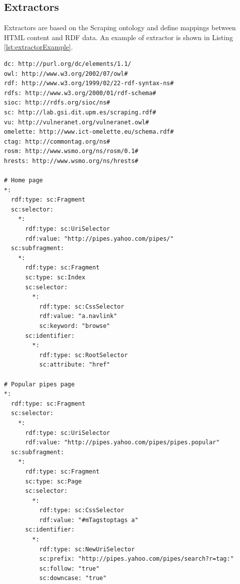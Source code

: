 \subsection{Extractors}

Extractors are based on the Scraping ontology and define mappings between HTML content
and RDF data. An example of extractor is shown in Listing \ref{lst:extractorExample}.


\begin{lstlisting}[style=mono,breaklines=true,label={lst:extractorExample}, caption=Extractor example for Yahoo! Pipes]
dc: http://purl.org/dc/elements/1.1/
owl: http://www.w3.org/2002/07/owl#
rdf: http://www.w3.org/1999/02/22-rdf-syntax-ns#
rdfs: http://www.w3.org/2000/01/rdf-schema#
sioc: http://rdfs.org/sioc/ns#
sc: http://lab.gsi.dit.upm.es/scraping.rdf#
vu: http://vulneranet.org/vulneranet.owl#
omelette: http://www.ict-omelette.eu/schema.rdf#
ctag: http://commontag.org/ns#
rosm: http://www.wsmo.org/ns/rosm/0.1#
hrests: http://www.wsmo.org/ns/hrests#

# Home page
*:
  rdf:type: sc:Fragment
  sc:selector:
    *:
      rdf:type: sc:UriSelector
      rdf:value: "http://pipes.yahoo.com/pipes/"
  sc:subfragment:
    *:
      rdf:type: sc:Fragment
      sc:type: sc:Index
      sc:selector:
        *:
          rdf:type: sc:CssSelector
          rdf:value: "a.navlink"
          sc:keyword: "browse"
      sc:identifier:
        *:
          rdf:type: sc:RootSelector
          sc:attribute: "href"

# Popular pipes page
*:
  rdf:type: sc:Fragment
  sc:selector:
    *:
      rdf:type: sc:UriSelector
      rdf:value: "http://pipes.yahoo.com/pipes/pipes.popular"
  sc:subfragment:
    *:
      rdf:type: sc:Fragment
      sc:type: sc:Page
      sc:selector:
        *:
          rdf:type: sc:CssSelector
          rdf:value: "#mTagstoptags a"
      sc:identifier:
        *:
          rdf:type: sc:NewUriSelector
          sc:prefix: "http://pipes.yahoo.com/pipes/search?r=tag:"
          sc:follow: "true"
          sc:downcase: "true"


\end{lstlisting}
